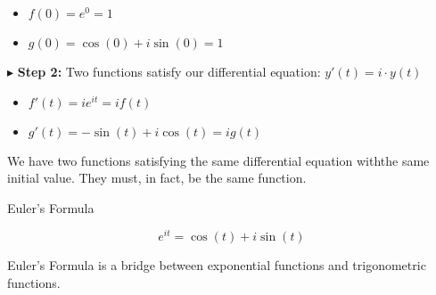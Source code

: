 \documentclass{ximera}
\begin{document}
\begin{itemize}
	\item $f(0) = e^0 = 1$
	\item $g(0) = \cos(0) + i \sin(0) = 1$
\end{itemize}





$\blacktriangleright$   \textbf{Step 2:} Two functions satisfy our differential equation: $y'(t) = i \cdot y(t)$



\begin{itemize}
	\item $f'(t) = i e^{i t} = i f(t)$
	\item $g'(t) = -\sin(t) + i \cos(t) = i g(t)$
\end{itemize}



We have two functions satisfying the same differential equation withthe same initial value.  They must, in fact, be the same function. \\




\begin{theorem} Euler's Formula


\[   e^{i t} = \cos(t) + i \sin(t)         \]


\end{theorem}




Euler's Formula is a bridge between exponential functions and trigonometric functions.
\end{document}
